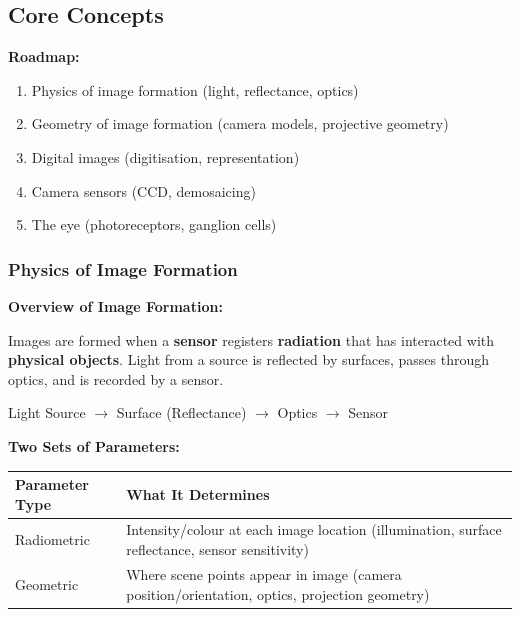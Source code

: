\subsection{Core Concepts}

\textbf{Roadmap:}
\begin{enumerate}
  \item Physics of image formation (light, reflectance, optics)
  \item Geometry of image formation (camera models, projective geometry)
  \item Digital images (digitisation, representation)
  \item Camera sensors (CCD, demosaicing)
  \item The eye (photoreceptors, ganglion cells)
\end{enumerate}

\bigseparator

\subsubsection{Physics of Image Formation}

\textbf{Overview of Image Formation:}

Images are formed when a \textbf{sensor} registers \textbf{radiation} that has interacted with \textbf{physical objects}. Light from a source is reflected by surfaces, passes through optics, and is recorded by a sensor.

\begin{center}
Light Source $\rightarrow$ Surface (Reflectance) $\rightarrow$ Optics $\rightarrow$ Sensor
\end{center}

\separator

\textbf{Two Sets of Parameters:}

\begin{center}
\renewcommand{\arraystretch}{1.3}
\begin{tabular}{@{} l p{10cm} @{}}
\toprule
\textbf{Parameter Type} & \textbf{What It Determines} \\
\midrule
Radiometric & Intensity/colour at each image location (illumination, surface reflectance, sensor sensitivity) \\
Geometric & Where scene points appear in image (camera position/orientation, optics, projection geometry) \\
\bottomrule
\end{tabular}
\end{center}

